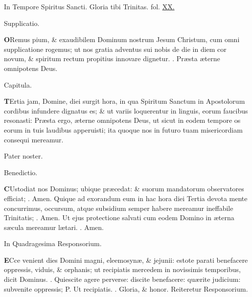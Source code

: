 \documentclass[letter,11pt]{book}
\makeatletter
\DeclareRobustCommand{\Vbar}{\vers@resp{-0.1em}{V}}
\DeclareRobustCommand{\Rbar}{\vers@resp{0pt}{R}}
\newcommand{\vers@resp@sym}{\raisebox{0.2ex}{\rotatebox[origin=c]{-20}{$\m@th\rceil$}}}
\newcommand{\vers@resp}[2]{%
  {\ooalign{\hidewidth\kern#1\vers@resp@sym\hidewidth\cr#2\cr}}%
}%
\def\P{\color{Red} P. \color{black}}
\def\V{\color{Red} \Vbar . \color{black}}
\def\R{\color{Red} \Rbar . \color{black}}
\makeatother
\begin{document}
\begin{multicols*}{2}
\par \color{Red} In Tempore Spiritus Sancti. G\color{black}loria tibi Trinitas. \color{Red} fol. \color{black} \hyperlink{}{XX.}
\vspace{-.5em} \begin{center} \color{Red} Supplicatio. \end{center} \vspace{-.5em}
\lettrine[lines=2]{\bfseries \color{Red} O}{}Remus pium, \& exaudibilem Dominum nostrum Jesum Christum, cum omni supplicatione rogemus; ut nos gratia adventus sui nobis de die in diem cor novum, \& spiritum rectum propitius innovare dignetur. \R Pr\ae sta \ae terne omnipotens Deus.
\vspace{-.5em} \begin{center} \color{Red} Capitula. \end{center} \vspace{-.5em}
\lettrine[lines=2]{\bfseries \color{Red} T}{}Ertia jam, Domine, diei surgit hora, in qua Spiritum Sanctum in Apostolorum cordibus infundere dignatus es; \& ut variis loquerentur in linguis, eorum faucibus resonasti: Pr\ae sta ergo, \ae terne omnipotens Deus, ut sicut in eodem tempore os eorum in tuis laudibus apperuisti; ita quoque nos in futuro tuam misericordiam consequi mereamur.
\par Pater noster.
\vspace{-.5em} \begin{center} \color{Red} Benedictio. \end{center} \vspace{-.5em}
\lettrine[lines=2]{\bfseries \color{Red} C}{}Ustodiat nos Dominus; ubique pr\ae cedat: \& suorum mandatorum observatores efficiat; \R Amen. Quique ad exorandum eum in hac hora diei Tertia devota mente concurrimus, occursum, atque subsidium semper habere mereamur ineffabile Trinitatis; \R Amen. Ut ejus protectione salvati cum eodem Domino in \ae terna s\ae cula mereamur l\ae tari. \R Amen.
\vspace{-.5em} \begin{center} \color{Red} In Quadragesima Responsorium. \end{center} \vspace{-.5em}
\lettrine[lines=2]{\bfseries \color{Red} E}{}Cce venient dies Domini magni, eleemosyn\ae , \& jejunii: estote parati benefacere oppressis, viduis, \& orphanis; ut recipiatis mercedem in novissimis temporibus, dicit Dominus. \V Quiescite agere perverse: discite benefacere: qu\ae rite judicium: subvenite oppressis; \P Ut recipiatis. \V Gloria, \& honor. \color{Red} Reiteretur Responsorium. \color{black}

\end{multicols*}
\end{document}

